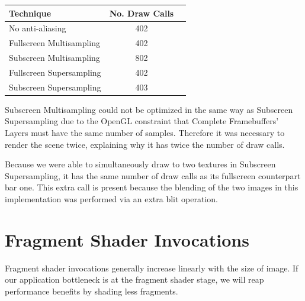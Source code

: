 \documentclass[12pt,a4paper,twoside,openright]{report}
\begin{document}
\begin{center}
\begin{tabular}{l|c|r}
Technique   & No. Draw Calls \\ 
\hline
No anti-aliasing      & 402 \\
Fullscreen Multisampling     & 402 \\
Subscreen Multisampling    &  802  \\
Fullscreen Supersampling      &  402   \\
Subscreen Supersampling    &  403  \\
\end{tabular}
\end{center}

\noindent Subscreen Multisampling could not be optimized in the same way as Subscreen Supersampling due to the OpenGL constraint that Complete Framebuffers' Layers must have the same number of samples. Therefore it was necessary to render the scene twice, explaining why it has twice the number of draw calls.

Because we were able to simultaneously draw to two textures in Subscreen Supersampling, it has the same number of draw calls as its fullscreen counterpart bar one. This extra call is present because the blending of the two images in this implementation was performed via an extra blit operation.

\section{Fragment Shader Invocations}

Fragment shader invocations generally increase linearly with the size of image. If our application bottleneck is at the fragment shader stage, we will reap performance benefits by shading less fragments.
\end{document}
